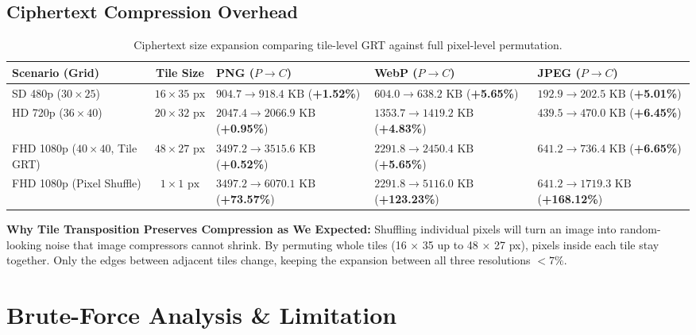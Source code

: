 \documentclass{article}
\begin{document}
\subsection{Ciphertext Compression Overhead}
\begin{table}[H]
\centering
\footnotesize
\begin{tabularx}{\textwidth}{l c >{\centering\arraybackslash}X >{\centering\arraybackslash}X >{\centering\arraybackslash}X}
\toprule
\textbf{Scenario (Grid)} & \textbf{Tile Size} & \textbf{PNG ($P \to C$)} & \textbf{WebP ($P \to C$)} & \textbf{JPEG ($P \to C$)} \\
\midrule
SD 480p ($30 \times 25$) & $16 \times 35\text{ px}$ & $904.7 \to 918.4\text{ KB}$ (\textbf{+1.52\%}) & $604.0 \to 638.2\text{ KB}$ (\textbf{+5.65\%}) & $192.9 \to 202.5\text{ KB}$ (\textbf{+5.01\%}) \\
HD 720p ($36 \times 40$) & $20 \times 32\text{ px}$ & $2047.4 \to 2066.9\text{ KB}$ (\textbf{+0.95\%}) & $1353.7 \to 1419.2\text{ KB}$ (\textbf{+4.83\%}) & $439.5 \to 470.0\text{ KB}$ (\textbf{+6.45\%}) \\
FHD 1080p ($40 \times 40$, Tile GRT) & $48 \times 27\text{ px}$ & $3497.2 \to 3515.6\text{ KB}$ (\textbf{+0.52\%}) & $2291.8 \to 2450.4\text{ KB}$ (\textbf{+5.65\%}) & $641.2 \to 736.4\text{ KB}$ (\textbf{+6.65\%}) \\
\midrule
FHD 1080p (Pixel Shuffle) & $1 \times 1\text{ px}$ & $3497.2 \to 6070.1\text{ KB}$ (\textbf{+73.57\%}) & $2291.8 \to 5116.0\text{ KB}$ (\textbf{+123.23\%}) & $641.2 \to 1719.3\text{ KB}$ (\textbf{+168.12\%}) \\
\bottomrule
\end{tabularx}
\caption{Ciphertext size expansion comparing tile-level GRT against full pixel-level permutation.}
\label{tab:compression}
\end{table}

\noindent \textbf{Why Tile Transposition Preserves Compression as We Expected:} Shuffling individual pixels will turn an image into random-looking noise that image compressors cannot shrink. By permuting
whole tiles (16 × 35 up to 48 × 27 px), pixels inside each tile stay together. Only the edges between adjacent tiles change, keeping the expansion between all three resolutions $< 7\%$.

\section{Brute-Force Analysis \& Limitation}
\end{document}
